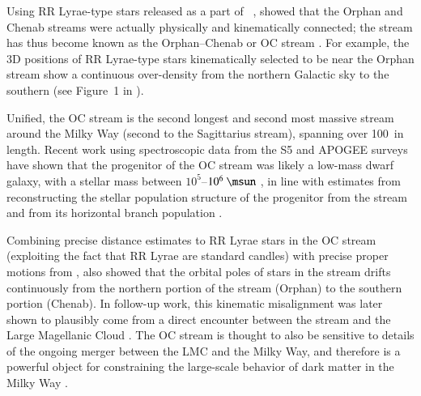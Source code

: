 \documentclass[final,5p,times,twocolumn,authoryear]{elsarticle}
\begin{document}
Using RR Lyrae-type stars released as a part of \gaia\ , \citet{koposov:2019}
showed that the Orphan and Chenab streams were actually physically and kinematically
connected; the stream has thus become known as the Orphan--Chenab or OC stream
\citep[see also][]{fardal:2019}.
For example, the 3D positions of RR Lyrae-type stars kinematically selected to be near
the Orphan stream show a continuous over-density from the northern Galactic sky to the
southern (see Figure~1 in \citealt{koposov:2019}).

Unified, the OC stream is the second longest and second most massive stream around the
Milky Way (second to the Sagittarius stream), spanning over 100~\kpc in length.
Recent work using spectroscopic data from the S5 and APOGEE surveys have shown that the
progenitor of the OC stream was likely a low-mass dwarf galaxy, with a stellar mass
between $10^5$--$10^6~\unit{\msun}$ \citep{koposov:2023, hawkins:2023}, in line with
estimates from reconstructing the stellar population structure of the progenitor from
the stream \citep{mendelsohn:2022} and from its horizontal branch population \citep{prudil:2021}.

Combining precise distance estimates to RR Lyrae stars in the OC stream (exploiting the
fact that RR Lyrae are standard candles) with precise proper motions from \gaia,
\citet{koposov:2019} also showed that the orbital poles of stars in the stream drifts
continuously from the northern portion of the stream (Orphan) to the southern portion
(Chenab).
In follow-up work, this kinematic misalignment was later shown to plausibly come from a
direct encounter between the stream and the Large Magellanic Cloud \citep{erkal:2019}.
The OC stream is thought to also be sensitive to details of the ongoing merger
between the LMC and the Milky Way, and therefore is a powerful object for constraining
the large-scale behavior of dark matter in the Milky Way \citep{lilleengen:2023}.
\end{document}
